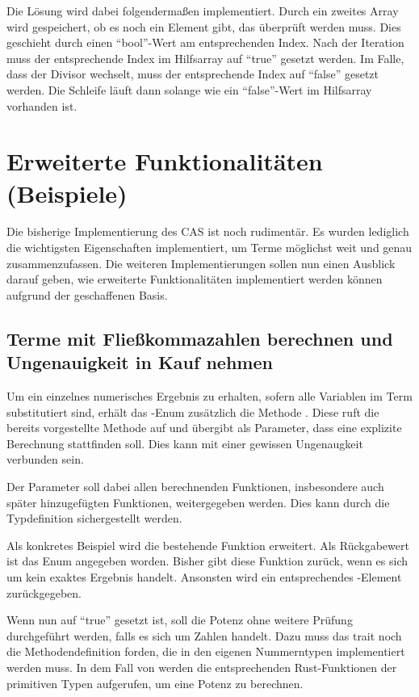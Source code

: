 \documentclass[11pt,a4paper, ngerman]{article}
\begin{document}
Die Lösung wird dabei folgendermaßen implementiert. Durch ein zweites Array wird gespeichert, ob es noch ein Element gibt, das überprüft werden muss. Dies geschieht durch einen ``bool''-Wert am entsprechenden Index. Nach der Iteration muss der entsprechende Index im Hilfsarray auf ``true'' gesetzt werden. Im Falle, dass der Divisor wechselt, muss der entsprechende Index auf ``false'' gesetzt werden. Die Schleife läuft dann solange wie ein ``false''-Wert im Hilfsarray vorhanden ist.

\newpage

\section{Erweiterte Funktionalitäten (Beispiele)}
Die bisherige Implementierung des CAS ist noch rudimentär. Es wurden lediglich die wichtigsten Eigenschaften implementiert, um Terme möglichst weit und genau zusammenzufassen.
Die weiteren Implementierungen sollen nun einen Ausblick darauf geben, wie erweiterte Funktionalitäten implementiert werden können aufgrund der geschaffenen Basis. 

\label{sec:ungenauigkeitenKapitel}
\subsection{Terme mit Fließkommazahlen berechnen und Ungenauigkeit in Kauf nehmen} Um ein einzelnes numerisches Ergebnis zu erhalten, sofern alle Variablen im Term substitutiert sind, erhält das -Enum zusätzlich die Methode . Diese ruft die bereits vorgestellte Methode  auf und übergibt als Parameter, dass eine explizite Berechnung stattfinden soll. Dies kann mit einer gewissen Ungenaugkeit verbunden sein.

Der Parameter  soll dabei allen berechnenden Funktionen, insbesondere auch später hinzugefügten Funktionen, weitergegeben werden. Dies kann durch die Typdefinition  sichergestellt werden.

Als konkretes Beispiel wird die bestehende Funktion  erweitert. Als Rückgabewert ist das Enum  angegeben worden. Bisher gibt diese Funktion  zurück, wenn es sich um kein exaktes Ergebnis handelt. Ansonsten wird ein entsprechendes -Element zurückgegeben.

Wenn nun  auf ``true'' gesetzt ist, soll die Potenz ohne weitere Prüfung durchgeführt werden, falls es sich um Zahlen handelt. Dazu muss das trait  noch die Methodendefinition  forden, die in den eigenen Nummerntypen implementiert werden muss. In dem Fall von  werden die entsprechenden Rust-Funktionen der primitiven Typen aufgerufen, um eine Potenz zu berechnen.
\end{document}
